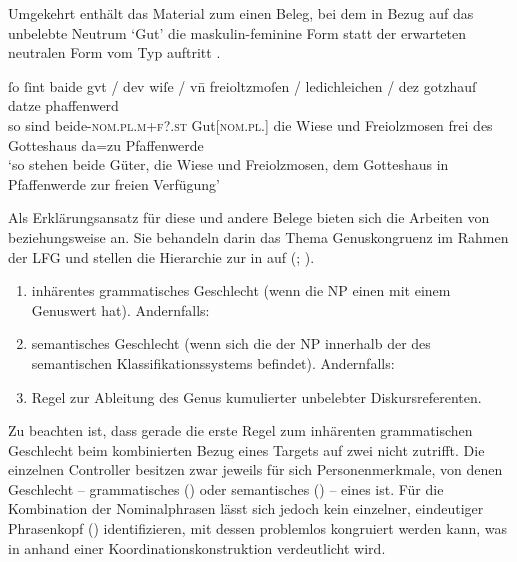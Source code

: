 Umgekehrt enthält das Material zum \CAO{} einen Beleg, bei dem in
Bezug auf das un\-belebte Neutrum  `Gut' die maskulin-feminine
Form  statt der erwarteten neutralen Form vom Typ 
auftritt .

\begin{exe}
\ex\label{ex:1584_gut2}
	\gll ſo ſint baide gvt / dev wiſe / vn̄ freioltzmoſen /
			ledichleichen / dez gotzhauſ datze phaffenwerd \\
		so sind beide-\textsc{nom.pl.m+f?\subI.st} Gut[\textsc{nom.pl.\NeutI}]
			{} die Wiese {} und Freiolzmosen {} frei {} des Gotteshaus da=zu
			Pfaffenwerde \\
	\trans `so stehen beide Güter, die Wiese und Freiolzmosen, dem Gotteshaus
		in Pfaffenwerde zur freien Verfügung'
		\parencites(Nr.~1584, Kl.~Herrenchiemsee, Kr.~Rosenheim, 1292)[727,26--27]{cao2}
\end{exe}

Als Erklärungsansatz für diese und andere Belege bieten sich die Arbeiten von
\citet[171--195]{wechslerzlatic2003} beziehungsweise \citet{wechsler2009} an.
Sie behandeln darin das Thema Genus\-kongruenz im Rahmen der
LFG
\autocites(vgl.~){bresnanetal2016} und stellen die
Hierarchie zur  in  auf (; \cites[584]{wechsler2009}[195]{wechslerzlatic2003}).

\begin{exe}
\ex\label{ex:gendasshier}
	\begin{enumerate}[noitemsep]
		\item inhärentes grammatisches Geschlecht (wenn die
			NP einen  mit einem Genuswert
			hat). Andernfalls:
		\item semantisches Geschlecht (wenn sich die  der NP
			innerhalb der  des semantischen Klassifikationssystems
			befindet). Andernfalls:
		\item Regel zur Ableitung des Genus kumulierter
			unbelebter Diskursreferenten.
	\end{enumerate}
\end{exe}

Zu beachten ist, dass gerade die erste Regel zum inhärenten grammatischen
Geschlecht beim kombinierten Bezug eines Targets auf zwei
 nicht zutrifft. Die einzelnen Controller besitzen zwar jeweils
für sich Personenmerkmale, von denen Geschlecht --
grammatisches () oder semantisches () -- eines ist. Für
die Kombination der Nominalphrasen lässt sich jedoch kein
einzelner, eindeutiger Phrasenkopf ()
identifizieren, mit dessen  problemlos
kongruiert werden kann, was in  anhand
einer Koordinations\-konstruktion verdeutlicht wird.

